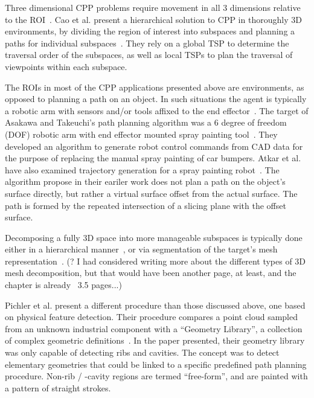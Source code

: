 Three dimensional CPP problems require movement in all 3 dimensions relative to the ROI~\cite{CPP_survey_for_robotics}.
Cao et al. present a hierarchical solution to CPP in thoroughly 3D environments, by dividing the region of interest into subspaces and planning a paths for individual subspaces~\cite{HiCPP_cplx_3D_env}.
They rely on a global TSP to determine the traversal order of the subspaces, as well as local TSPs to plan the traversal of viewpoints within each subspace.

The ROIs in most of the CPP applications presented above are environments, as opposed to planning a path on an object.
In such situations the agent is typically a robotic arm with sensors and/or tools affixed to the end effector~\cite{Metal_polishing_robot_sys, Automatic_spray_painting_unknown_parts}.
The target of Asakawa and Takeuchi's path planning algorithm was a 6 degree of freedom (DOF) robotic arm with end effector mounted spray painting tool~\cite{Automatic_spray_painting_path}.
They developed an algorithm to generate robot control commands from CAD data for the purpose of replacing the manual spray painting of car bumpers.
Atkar et al. have also examined trajectory generation for a spray painting robot~\cite{Uniform_cov_auto_surfaces, Exact_cell_decomp_orientable_surfaces}.
The algorithm propose in their eariler work does not plan a path on the object's surface directly, but rather a virtual surface offset from the actual surface.
The path is formed by the repeated intersection of a slicing plane with the offset surface.

Decomposing a fully 3D space into more manageable subspaces is typically done either in a hierarchical manner~\cite{HiCPP_cplx_3D_env}, or via segmentation of the target's mesh representation~\cite{Mesh_segm_technik_survey}.
(? I had considered writing more about the different types of 3D mesh decomposition, but that would have been another page, at least, and the chapter is already ~3.5 pages...)

Pichler et al. present a different procedure than those discussed above, one based on physical feature detection.
Their procedure compares a point cloud sampled from an unknown industrial component with a ``Geometry Library'', a collection of complex geometric definitions~\cite{Automatic_spray_painting_unknown_parts}.
In the paper presented, their geometry library was only capable of detecting ribs and cavities.
The concept was to detect elementary geometries that could be linked to a specific predefined path planning procedure.
Non-rib / -cavity regions are termed ``free-form'', and are painted with a pattern of straight strokes.

